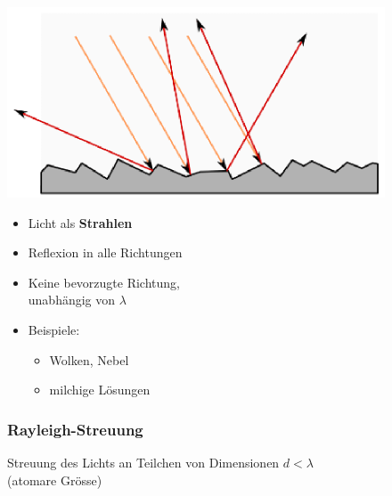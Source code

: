 \begin{minipage}{0.45\linewidth}
\includegraphics[width=\linewidth]{Bilder/Wellen-Optik/diffuse_streuung}
\end{minipage}
\hfill
\begin{minipage}{0.53\linewidth}

\begin{itemize}
\item Licht als \textbf{Strahlen}
\item Reflexion in alle Richtungen
\item Keine bevorzugte Richtung, \\
	  unabhängig von $\lambda$ 
\item Beispiele:
	\begin{itemize}
		\item Wolken, Nebel 
		\item milchige Lösungen
	\end{itemize}	  
\end{itemize}

\end{minipage}




\subsubsection{Rayleigh-Streuung}

Streuung des Lichts an Teilchen von Dimensionen $d < \lambda$ \\
(atomare Grösse) \\ 


